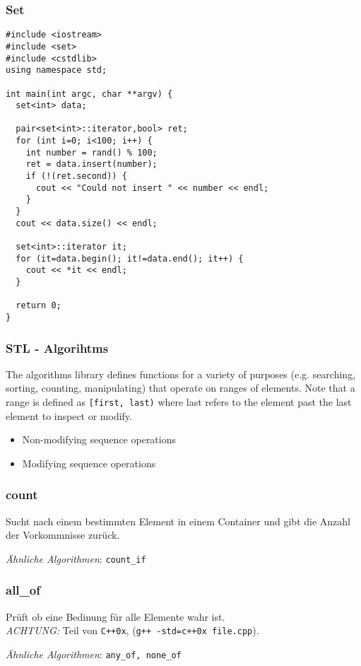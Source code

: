 \begin{frame}[fragile] 
\frametitle{Set}
{\tiny
\begin{lstlisting}
#include <iostream>
#include <set>
#include <cstdlib>
using namespace std;

int main(int argc, char **argv) {
  set<int> data;

  pair<set<int>::iterator,bool> ret;
  for (int i=0; i<100; i++) {
    int number = rand() % 100;
    ret = data.insert(number);
    if (!(ret.second)) {
      cout << "Could not insert " << number << endl;
    }
  }
  cout << data.size() << endl;

  set<int>::iterator it;
  for (it=data.begin(); it!=data.end(); it++) {
    cout << *it << endl;
  }

  return 0;
}
\end{lstlisting}
}
\end{frame}

\begin{frame}[fragile] 
\frametitle{STL - Algorihtms}
The algorithms library defines functions for a variety of purposes (e.g. searching, sorting,
counting, manipulating) that operate on ranges of elements. Note that a range is defined as
\verb|[first, last)| where last refers to the element past the last element to inspect or modify. 
\begin{itemize}
\item Non-modifying sequence operations
\item Modifying sequence operations
\end{itemize}

\end{frame}

\begin{frame}[fragile]
\frametitle{count}
{\tiny
Sucht nach einem bestimmten Element in einem
Container und gibt die Anzahl der Vorkommnisse zurück.



\emph{Ähnliche Algorithmen}: \verb|count_if|
}
\end{frame}

\begin{frame}[fragile]
\frametitle{all\_of}
{\tiny
Prüft ob eine Bedinung für alle Elemente wahr ist.\\
\emph{ACHTUNG:} Teil von \verb|C++0x|, (\verb|g++ -std=c++0x file.cpp|).



\emph{Ähnliche Algorithmen}: \verb|any_of, none_of|
}
\end{frame}

